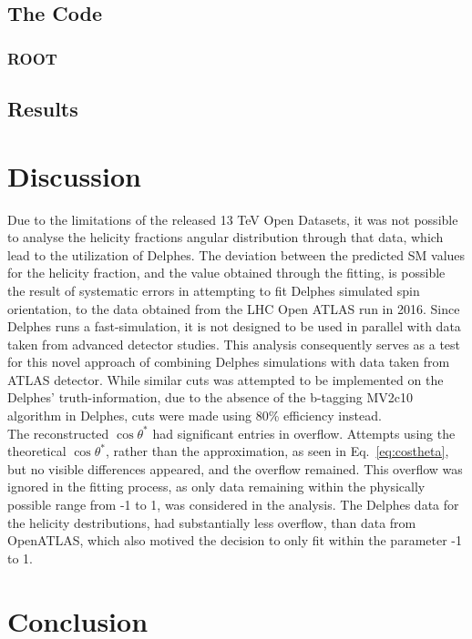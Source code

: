 \documentclass[12pt,a4paper]{article}
\begin{document}




\subsection{The Code}

\subsubsection{ROOT}

\subsection{Results}

\section{Discussion}
Due to the limitations of the released 13 TeV Open Datasets, it was not possible
to analyse the helicity fractions angular distribution through that data, which
lead to the utilization of Delphes. The deviation between the predicted SM
values for the helicity fraction, and the value obtained through the fitting, is
possible the result of systematic errors in attempting to fit Delphes simulated
spin orientation, to the data obtained from the LHC Open ATLAS run in 2016.
Since Delphes runs a fast-simulation, it is not designed to be used in parallel
with data taken from advanced detector studies. This analysis consequently
serves as a test for this novel approach of combining Delphes simulations with
data taken from ATLAS detector. While similar cuts was attempted to be
implemented on the Delphes' truth-information, due to the absence of the
b-tagging MV2c10 algorithm in Delphes, cuts were made using 80\% efficiency
instead.\\  %

The reconstructed $\cos \theta^*$ had significant entries in overflow. Attempts using
the theoretical $\cos \theta^*$, rather than the approximation, as seen in
Eq.~\ref{eq:costheta}, but no visible differences appeared, and the overflow
remained. This overflow was ignored in the fitting process, as only data
remaining within the physically possible range from -1 to 1, was considered in
the analysis. The Delphes data for the helicity destributions, had substantially
less overflow, than data from OpenATLAS, which also motived the decision to only
fit within the parameter -1 to 1.

\section{Conclusion}

\printbibliography
\end{document}
